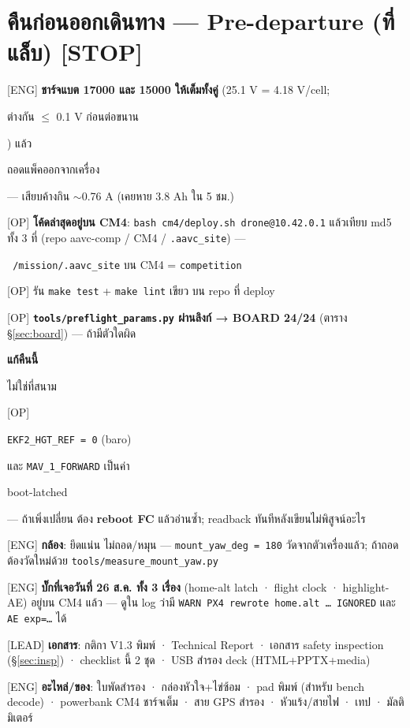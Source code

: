 \documentclass[11pt,a4paper]{article}
\newcommand{\code}[1]{\texttt{\small #1}}
\newcommand{\stoptag}{{\bfseries\color{stopred}[STOP]}}
\newcommand{\hl}[1]{\colorbox{hlyel}{\strut #1}}
\newcommand{\hlr}[1]{\colorbox{hlred}{\strut\color{stopred}\bfseries #1}}
\newcommand{\who}[1]{{\small\color{blu}[#1]}}
\begin{document}
\section{คืนก่อนออกเดินทาง — Pre-departure (ที่แล็บ) \stoptag}
\begin{cl}
\item \who{ENG} \textbf{ชาร์จแบต 17000 และ 15000 ให้เต็มทั้งคู่} (25.1 V = 4.18 V/cell; \hl{ต่างกัน $\leq$ 0.1 V ก่อนต่อขนาน}) แล้ว \hl{ถอดแพ็คออกจากเครื่อง} — เสียบค้างกิน $\sim$0.76 A (เคยหาย 3.8 Ah ใน 5 ชม.)
\item \who{OP} \textbf{โค้ดล่าสุดอยู่บน CM4}: \code{bash cm4/deploy.sh drone@10.42.0.1} แล้วเทียบ md5 ทั้ง 3 ที่ (repo aavc-comp / CM4 / \code{.aavc_site}) — \hl{\code{~/mission/.aavc_site} บน CM4 = \code{competition}}
\item \who{OP} รัน \code{make test} + \code{make lint} เขียว บน repo ที่ deploy
\item \who{OP} \textbf{\code{tools/preflight_params.py} ผ่านลิงก์ → BOARD 24/24} (ตาราง §\ref{sec:board}) — ถ้ามีตัวใดผิด \hlr{แก้คืนนี้} ไม่ใช่ที่สนาม
\item \who{OP} \hl{\code{EKF2_HGT_REF = 0} (baro)} และ \code{MAV_1_FORWARD} เป็นค่า \hl{boot-latched} — ถ้าเพิ่งเปลี่ยน ต้อง \textbf{reboot FC} แล้วอ่านซ้ำ; readback ทันทีหลังเขียนไม่พิสูจน์อะไร
\item \who{ENG} \textbf{กล้อง}: ยึดแน่น ไม่ถอด/หมุน — \code{mount_yaw_deg = 180} วัดจากตัวเครื่องแล้ว; ถ้าถอดต้องวัดใหม่ด้วย \code{tools/measure_mount_yaw.py}
\item \who{ENG} \textbf{บั๊กที่เจอวันที่ 26 ส.ค. ทั้ง 3 เรื่อง} (home-alt latch · flight clock · highlight-AE) อยู่บน CM4 แล้ว — ดูใน log ว่ามี \code{WARN PX4 rewrote home.alt … IGNORED} และ \code{AE exp=…} ได้
\item \who{LEAD} \textbf{เอกสาร}: กติกา V1.3 พิมพ์ · Technical Report · เอกสาร safety inspection (§\ref{sec:insp}) · checklist นี้ 2 ชุด · USB สำรอง deck (HTML+PPTX+media)
\item \who{ENG} \textbf{อะไหล่/ของ}: ใบพัดสำรอง · กล่องหัวใจ+ไข่ซ้อม · pad พิมพ์ (สำหรับ bench decode) · powerbank CM4 ชาร์จเต็ม · สาย GPS สำรอง · หัวแร้ง/สายไฟ · เทป · มัลติมิเตอร์
\end{cl}

\end{document}
